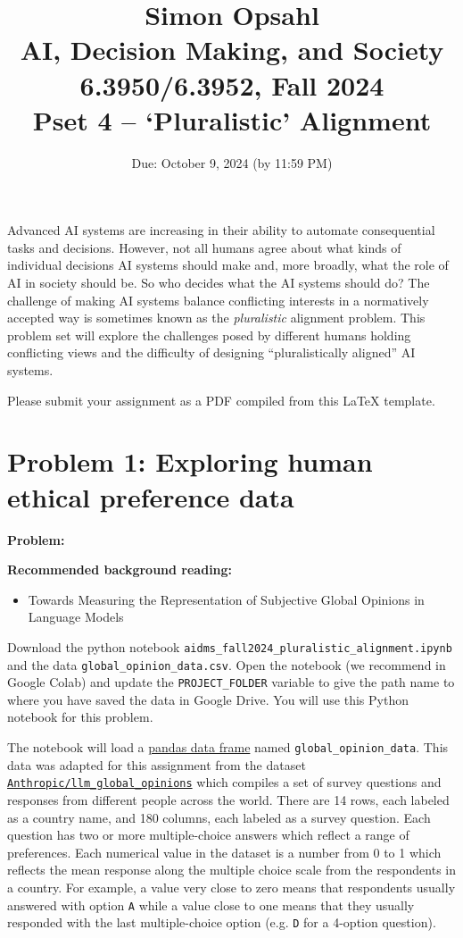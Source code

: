 \documentclass{article}
\title{\textbf{Simon Opsahl}\\AI, Decision Making, and Society\\6.3950/6.3952, Fall 2024\\Pset 4 -- `Pluralistic' Alignment}
\begin{document}
\date{Due: October 9, 2024 (by 11:59 PM)}

\maketitle


Advanced AI systems are increasing in their ability to automate consequential tasks and decisions. 
However, not all humans agree about what kinds of individual decisions AI systems should make and, more broadly, what the role of AI in society should be.
So who decides what the AI systems should do?
The challenge of making AI systems balance conflicting interests in a normatively accepted way is sometimes known as the \emph{pluralistic} alignment problem.
This problem set will explore the challenges posed by different humans holding conflicting views and the difficulty of designing ``pluralistically aligned'' AI systems. 

Please submit your assignment as a PDF compiled from this LaTeX template.





\newpage

\section*{Problem 1: Exploring human ethical preference data}

\textbf{Problem:}

\textbf{Recommended background reading:}
\begin{itemize}
    \item Towards Measuring the Representation of Subjective Global Opinions in Language Models \citep{durmus2023towards}
\end{itemize}

Download the python notebook \texttt{aidms\_fall2024\_pluralistic\_alignment.ipynb} and the data \texttt{global\_opinion\_data.csv}. Open the notebook (we recommend in Google Colab) and update the \texttt{PROJECT\_FOLDER} variable to give the path name to where you have saved the data in Google Drive. You will use this Python notebook for this problem. 

The notebook will load a \href{https://pandas.pydata.org/docs/user_guide/index.html}{pandas data frame} named  \texttt{global\_opinion\_data}. 
This data was adapted for this assignment from the dataset \href{https://huggingface.co/datasets/Anthropic/llm_global_opinions}{\texttt{Anthropic/llm\_global\_opinions}} which compiles a set of survey questions and responses from different people across the world. 
There are 14 rows, each labeled as a country name, and 180 columns, each labeled as a survey question. 
Each question has two or more multiple-choice answers which reflect a range of preferences.
Each numerical value in the dataset is a number from 0 to 1 which reflects the mean response along the multiple choice scale from the respondents in a country. For example, a value very close to zero means that respondents usually answered with option \texttt{A} while a value close to one means that they usually responded with the last multiple-choice option (e.g. \texttt{D} for a 4-option question).
\end{document}
